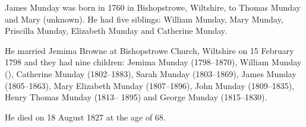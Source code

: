 
James Munday was born in 1760  in Bishopstrowe, Wiltshire, to Thomas Munday and Mary (unknown). He had five siblings:
William Munday,  Mary Munday, Priscilla Munday, Elizabeth Munday and Catherine Munday.

He married Jemima Browne at Bishopstrowe Church, Wiltshire on 15 February 1798 and they had nine children: Jemima Munday (1798--1870), William Munday (), Catherine Munday (1802--1883), Sarah Munday (1803--1869),
James Munday (1805--1863), Mary Elizabeth Munday (1807--1896), John Munday (1809--1835), Henry Thomas Munday (1813-- 1895) and George Munday (1815--1830).

He died on 18 August 1827 at the age of 68.

